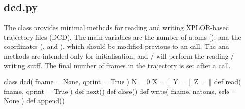 \normalsize
\subsection[dcd]{dcd.py}
The class  provides
minimal methods for reading and writing XPLOR-based trajectory files (DCD). The main variables are
the number of atoms (); and the coordinates (,  and ), which should
be modified previous to an  call. The  and  methods are intended
only for initialisation, and  /  will perform the reading / writing sutff.
The final number of frames in the trajectory is set after a  call.\\
\begin{pyglist}[language=python,fvset={frame=single}]
class dcd( fname = None, qprint = True )
    N = 0
    X = []
    Y = []
    Z = []
    def read( fname, qprint = True )
    def next()
    def close()
    def write( fname, natoms, sele = None )
    def append()
\end{pyglist}
